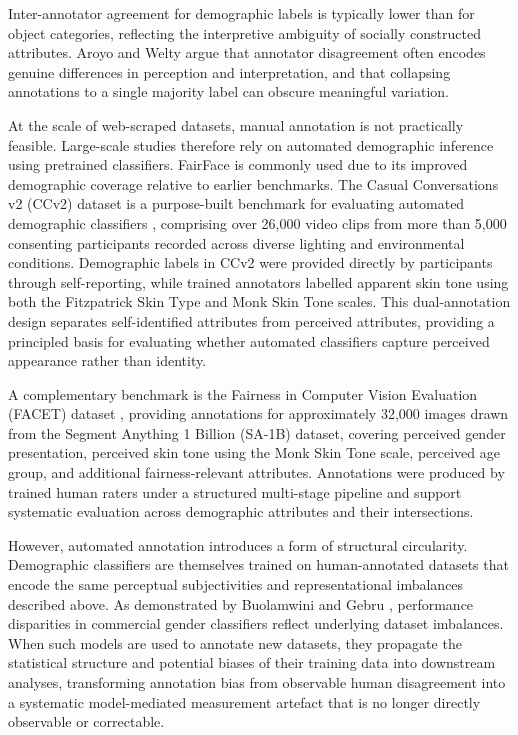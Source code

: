 Inter-annotator agreement for demographic labels is typically lower than for object categories, reflecting the interpretive ambiguity of socially constructed attributes. Aroyo and Welty \cite{Aroyo_2015_CrowdTruth} argue that annotator disagreement often encodes genuine differences in perception and interpretation, and that collapsing annotations to a single majority label can obscure meaningful variation.

At the scale of web-scraped datasets, manual annotation is not practically feasible. Large-scale studies therefore rely on automated demographic inference using pretrained classifiers. FairFace \cite{Karkkainen_2021_FairFace} is commonly used due to its improved demographic coverage relative to earlier benchmarks. The Casual Conversations v2 (CCv2) dataset is a purpose-built benchmark for evaluating automated demographic classifiers \cite{Porgali_2023_CCv2}, comprising over 26,000 video clips from more than 5,000 consenting participants recorded across diverse lighting and environmental conditions. Demographic labels in CCv2 were provided directly by participants through self-reporting, while trained annotators labelled apparent skin tone using both the Fitzpatrick Skin Type and Monk Skin Tone scales. This dual-annotation design separates self-identified attributes from perceived attributes, providing a principled basis for evaluating whether automated classifiers capture perceived appearance rather than identity.

A complementary benchmark is the Fairness in Computer Vision Evaluation (FACET) dataset \cite{Gustafson_2023_FACET}, providing annotations for approximately 32,000 images drawn from the Segment Anything 1 Billion (SA-1B) dataset, covering perceived gender presentation, perceived skin tone using the Monk Skin Tone scale, perceived age group, and additional fairness-relevant attributes. Annotations were produced by trained human raters under a structured multi-stage pipeline and support systematic evaluation across demographic attributes and their intersections.

However, automated annotation introduces a form of structural circularity. Demographic classifiers are themselves trained on human-annotated datasets that encode the same perceptual subjectivities and representational imbalances described above. As demonstrated by Buolamwini and Gebru \cite{Buolamwini_2018_GenderShades}, performance disparities in commercial gender classifiers reflect underlying dataset imbalances. When such models are used to annotate new datasets, they propagate the statistical structure and potential biases of their training data into downstream analyses, transforming annotation bias from observable human disagreement into a systematic model-mediated measurement artefact that is no longer directly observable or correctable.


